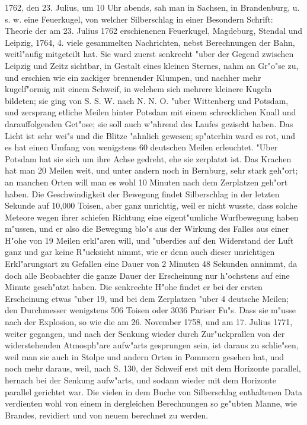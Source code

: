 \documentclass[a4paper, 11pt, oneside, polutonikogreek, german]{article}
\begin{document}
1762, den 23. Julius, um 10 Uhr abends, sah man in Sachsen, in Brandenburg, u. s. w. eine Feuerkugel, von welcher Silberschlag in einer Besondern Schrift: Theorie der am 23. Julius 1762 erschienenen Feuerkugel, Magdeburg, Stendal und Leipzig, 1764, 4. viele gesammelten Nachrichten, nebst Berechnungen der Bahn, weitl"aufig mitgeteilt hat. Sie ward zuerst senkrecht "uber der Gegend zwischen Leipzig und Zeitz sichtbar, in Gestalt eines kleinen Sternes, nahm an Gr"o"se zu, und erschien wie ein zackiger brennender Klumpen, und nachher mehr kugelf"ormig mit einem Schweif, in welchem sich mehrere kleinere Kugeln bildeten; sie ging von S. S. W. nach N. N. O. "uber Wittenberg und Potsdam, und zersprang etliche Meilen hinter Potsdam mit einem schrecklichen Knall und darauffolgenden Get"ose; sie soll auch w"ahrend des Laufes gezischt haben. Das Licht ist sehr wei"s und die Blitze "ahnlich gewesen; sp"aterhin ward es rot, und es hat einen Umfang von wenigstens 60 deutschen Meilen erleuchtet. "Uber Potsdam hat sie sich um ihre Achse gedreht, ehe sie zerplatzt ist. Das Krachen hat man 20 Meilen weit, und unter andern noch in Bernburg, sehr stark geh"ort; an manchen Orten will man es wohl 10 Minuten nach dem Zerplatzen geh"ort haben. Die Geschwindigkeit der Bewegung findet Silberschlag in der letzten Sekunde auf 10,000 Toisen, aber ganz unrichtig, weil er nicht wusste, dass solche Meteore wegen ihrer schiefen Richtung eine eigent"umliche Wurfbewegung haben m"ussen, und er also die Bewegung blo"s aus der Wirkung des Falles aus einer H"ohe von 19 Meilen erkl"aren will, und "uberdies auf den Widerstand der Luft ganz und gar keine R"ucksicht nimmt, wie er denn auch dieser unrichtigen Erkl"arungsart zu Gefallen eine Dauer von 2 Minuten 48 Sekunden annimmt, da doch alle Beobachter die ganze Dauer der Erscheinung nur h"ochstens auf eine Minute gesch"atzt haben. Die senkrechte H"ohe findet er bei der ersten Erscheinung etwas "uber 19, und bei dem Zerplatzen "uber 4 deutsche Meilen; den Durchmesser wenigstens 506 Toisen oder 3036 Pariser Fu"s. Dass sie m"usse nach der Explosion, so wie die am 26. November 1758, und am 17. Julius 1771, weiter gegangen, und nach der Senkung wieder durch Zur"uckprallen von der widerstehenden Atmosph"are aufw"arts gesprungen sein, ist daraus zu schlie"sen, weil man sie auch in Stolpe und andern Orten in Pommern gesehen hat, und noch mehr daraus, weil, nach S. 130, der Schweif erst mit dem Horizonte parallel, hernach bei der Senkung aufw"arts, und sodann wieder mit dem Horizonte parallel gerichtet war. Die vielen in dem Buche von Silberschlag enthaltenen Data verdienten wohl von einem in dergleichen Berechnungen so ge"ubten Manne, wie Brandes, revidiert und von neuem berechnet zu werden.
\end{document}
